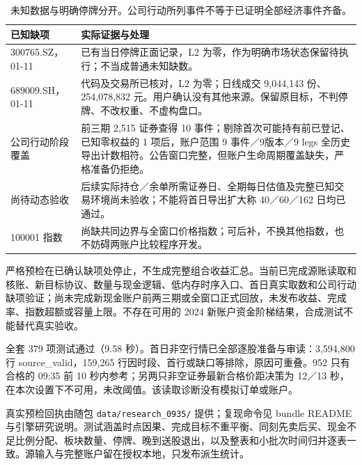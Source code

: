 \begin{table}[H]\centering\small
\begin{tabularx}{\linewidth}{p{32mm}Y}
\toprule 已知缺项 & 实际证据与处理\\\midrule
300765.SZ，01-11 & 已有当日停牌正面记录，L2 为零，作为明确市场状态保留待执行；不当成普通未知缺数。\\
689009.SH，01-11 & 代码及交易所已核对，L2 为零；日线成交 9,044,143 份、254,078,832 元。用户确认没有其他来源。保留原目标，不判停牌、不改权重、不虚构盘口。\\
公司行动阶段覆盖 & 前三期 2,515 证券查得 10 事件；剔除首次可能持有前已登记、已知零权益的 1 项后，账户范围 9 事件／9版本／9 legs 全历史导出计数相符。公告窗口完整，但账户生命周期覆盖缺失，严格准备仍拒绝。\\
尚待动态验收 & 后续实际持仓／余单所需证券日、全期每日估值及完整已知交易环境尚未验收；不能将首日导出扩大称 40／60／162 日均已通过。\\
100001 指数 & 尚缺共同边界与全窗口价格指数；可后补，不换其他指数，也不妨碍两账户比较程序开发。\\
\bottomrule
\end{tabularx}
\caption{未知数据与明确停牌分开。公司行动所列事件不等于已证明全部经济事件齐备。}
\end{table}

严格预检在已确认缺项处停止，不生成完整组合收益汇总。当前已完成源账读取和核账、新目标协议、数量与现金逻辑、低内存时序入口、首日真实取数和公司行动缺项验证；尚未完成新现金账户前两三期或全窗口正式回放，未发布收益、完成率、指数超额或容量上限。不存在可用的 2024 新账户资金阶梯结果，合成测试不能替代真实验收。

全套 379 项测试通过（9.58 秒）。首日非空行情已全部逐股准备与审读：3,594,800 行 source\_valid，159,265 行因时段、首行或缺口等排除，原因可重叠。952 只有合格的 09:35 前 10 秒内参考；另两只非空证券最新合格价距决策为 12／13 秒，在本次设置下不可用，未改阈值。该读取诊断没有模拟订单或账户。

真实预检回执由随包 \texttt{data/research\_0935/} 提供；复现命令见 bundle README 与引擎研究说明。测试涵盖时点因果、完成目标不重平衡、同刻先卖后买、现金不足比例分配、板块数量、停牌、晚到送股退出，以及整表和小批次时间归并逐表一致。源输入与完整账户留在授权本地，只发布派生统计。
